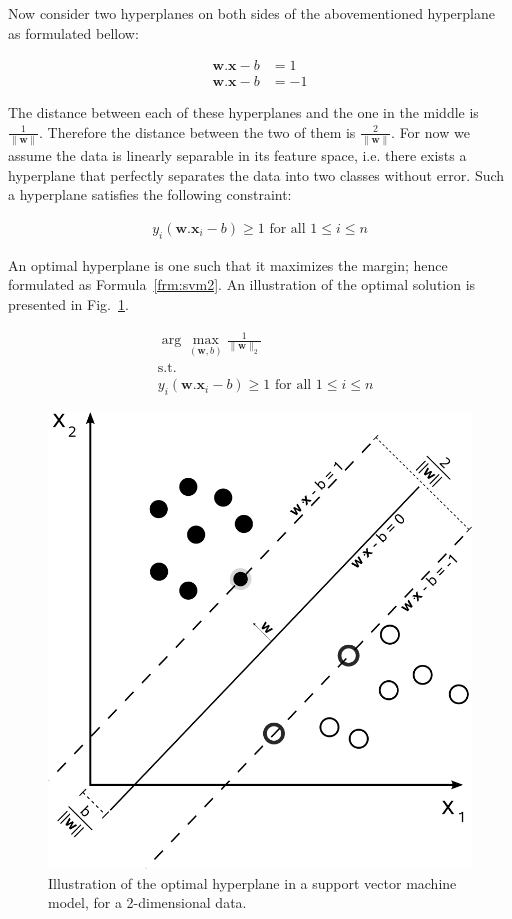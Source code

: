 Now consider two hyperplanes on both sides of the abovementioned hyperplane as formulated bellow:

\begin{align}
  \mathbf{w} . \mathbf{x} - b &= 1 \nonumber \\
  \mathbf{w} . \mathbf{x} - b &= -1
\end{align}

The distance between each of these hyperplanes and the one in the middle is $\frac{1}{\parallel \mathbf{w} \parallel}$. Therefore the distance between the two of them is $\frac{2}{\parallel \mathbf{w} \parallel}$. For now we assume the data is linearly separable in its feature space, i.e. there exists a hyperplane that perfectly separates the data into two classes without error. Such a hyperplane satisfies the following constraint:

\begin{align}
  y_i (\mathbf{w} . \mathbf{x}_i - b)\geq 1 \text{ for all } 1 \leq i \leq n
\end{align}

An optimal hyperplane is one such that it maximizes the margin; hence formulated as Formula~\ref{frm:svm2}. An illustration of the optimal solution is presented in Fig.~\ref{fig:svm-hyperplane}.

\begin{align}
  &\arg\max_{(\mathbf{w},b)}\frac{1}{\|\mathbf{w}\|_2} \nonumber \\
  &\text{s.t.} \nonumber \\
  &y_i (\mathbf{w} . \mathbf{x}_i - b)\geq 1 \text{ for all } 1 \leq i \leq n
  \label{frm:svm2}
\end{align}

\begin{figure}[!ht]
  \centering
  \includegraphics[width=.5\textwidth]{figs/background/Svm_max_sep_hyperplane_with_margin}
  \caption{Illustration of the optimal hyperplane in a support vector machine model, for a 2-dimensional data.}
  \label{fig:svm-hyperplane}
\end{figure}

